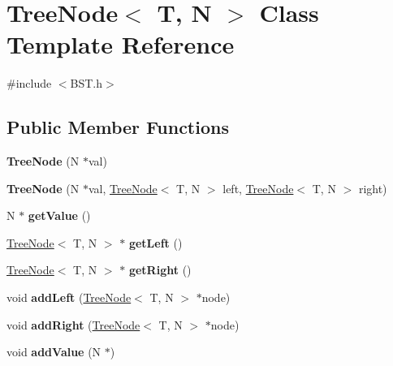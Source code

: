 \hypertarget{class_tree_node}{}\section{Tree\+Node$<$ T, N $>$ Class Template Reference}
\label{class_tree_node}


{\ttfamily \#include $<$B\+S\+T.\+h$>$}

\subsection*{Public Member Functions}
\begin{DoxyCompactItemize}
\item 
\mbox{\label{class_tree_node_ae4c36a49bc495116eea1aca789683785}} 
{\bfseries Tree\+Node} (N $\ast$val)
\item 
\mbox{\label{class_tree_node_a07af5125bd340cc049a7f3ffed2bb934}} 
{\bfseries Tree\+Node} (N $\ast$val, \hyperlink{class_tree_node}{Tree\+Node}$<$ T, N $>$ left, \hyperlink{class_tree_node}{Tree\+Node}$<$ T, N $>$ right)
\item 
\mbox{\label{class_tree_node_a8dc87560d38bbe101a30a834760a2fb3}} 
N $\ast$ {\bfseries get\+Value} ()
\item 
\mbox{\label{class_tree_node_ae10580e578ff353006e3c6e2db44b568}} 
\hyperlink{class_tree_node}{Tree\+Node}$<$ T, N $>$ $\ast$ {\bfseries get\+Left} ()
\item 
\mbox{\label{class_tree_node_a00d3565d6fd93b80ea1dac1a446c7941}} 
\hyperlink{class_tree_node}{Tree\+Node}$<$ T, N $>$ $\ast$ {\bfseries get\+Right} ()
\item 
\mbox{\label{class_tree_node_a2cdbeb6bca29480c4a485cea6f409e93}} 
void {\bfseries add\+Left} (\hyperlink{class_tree_node}{Tree\+Node}$<$ T, N $>$ $\ast$node)
\item 
\mbox{\label{class_tree_node_a9047f15c81fdba890139453be4b0c43a}} 
void {\bfseries add\+Right} (\hyperlink{class_tree_node}{Tree\+Node}$<$ T, N $>$ $\ast$node)
\item 
\mbox{\label{class_tree_node_a822ab4fffa26483a181b603bda46f00e}} 
void {\bfseries add\+Value} (N $\ast$)
\end{DoxyCompactItemize}


